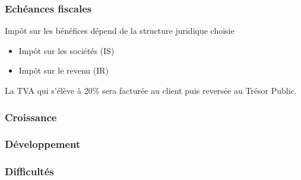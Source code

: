 \documentclass[10pt]{article}
\begin{document}

\subsubsection{Echéances fiscales}
\label{ssub:echéance_fiscales}

Impôt sur les bénéfices dépend de la structure juridique choisie 
\begin{itemize}
	\item Impôt sur les sociétés (IS)
	\item Impôt sur le revenu (IR) \\
\end{itemize}


La TVA qui s'élève à 20\% sera facturée au client puis reversée au Trésor Public.

\subsubsection{Croissance}
\label{ssub:croissance}

\subsubsection{Développement}
\label{ssub:developpement}

\subsubsection{Difficultés}
\label{ssub:difficultés}






\end{document}
